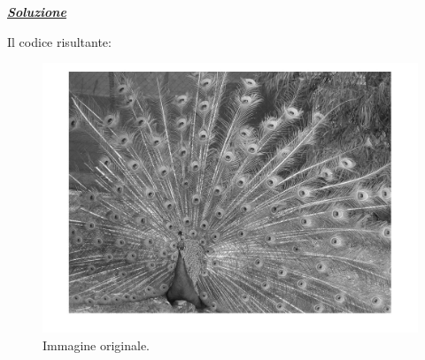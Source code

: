 \documentclass[a4paper]{article}
\begin{document}
	\noindent
	\textcolor{Green4}{\textbf{\emph{\underline{Soluzione}}}}\newline
	
	\noindent
	Il codice risultante:
	
	
	\begin{figure}[!htp]
		\centering
		\includegraphics[width=\textwidth]{img/lab/operato-locali-1.jpg}
		\caption{Immagine originale.}
	\end{figure}\newpage
	
\end{document}
